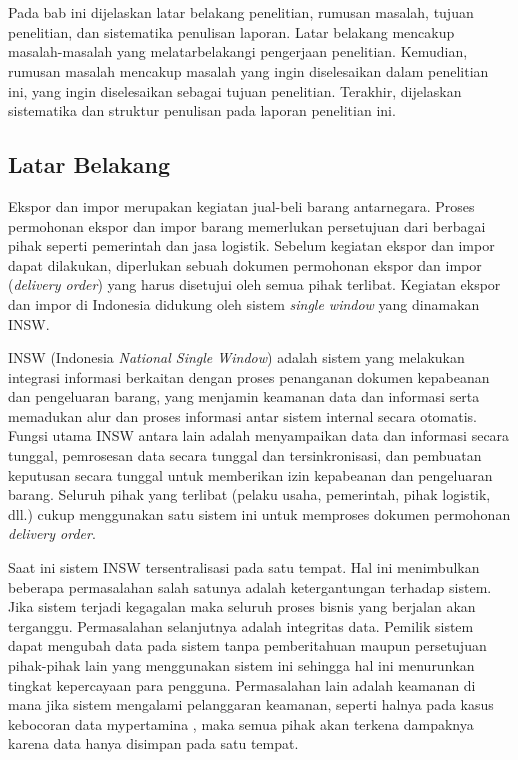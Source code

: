 \chapter{\babSatu}
\label{bab:1}

Pada bab ini dijelaskan latar belakang penelitian, rumusan masalah, tujuan penelitian, dan sistematika penulisan laporan. Latar belakang mencakup masalah-masalah yang melatarbelakangi pengerjaan penelitian. Kemudian, rumusan masalah mencakup masalah yang ingin diselesaikan dalam penelitian ini, yang ingin diselesaikan sebagai tujuan penelitian. Terakhir, dijelaskan sistematika dan struktur penulisan pada laporan penelitian ini.

\section{Latar Belakang}
\label{sec:latarBelakang}

Ekspor dan impor merupakan kegiatan jual-beli barang antarnegara. Proses permohonan ekspor dan impor barang memerlukan persetujuan dari berbagai pihak seperti pemerintah dan jasa logistik. Sebelum kegiatan ekspor dan impor dapat dilakukan, diperlukan sebuah dokumen permohonan ekspor dan impor (\textit{delivery order}) yang harus disetujui oleh semua pihak terlibat. Kegiatan ekspor dan impor di Indonesia didukung oleh sistem \textit{single window} yang dinamakan INSW.

INSW (Indonesia \textit{National Single Window}) adalah sistem yang melakukan integrasi informasi berkaitan dengan proses penanganan dokumen kepabeanan dan pengeluaran barang, yang menjamin keamanan data dan informasi serta memadukan alur dan proses informasi antar sistem internal secara otomatis. Fungsi utama INSW antara lain adalah menyampaikan data dan informasi secara tunggal, pemrosesan data secara tunggal dan tersinkronisasi, dan pembuatan keputusan secara tunggal untuk memberikan izin kepabeanan dan pengeluaran barang. Seluruh pihak yang terlibat (pelaku usaha, pemerintah, pihak logistik, dll.) cukup menggunakan satu sistem ini untuk memproses dokumen permohonan \textit{delivery order}.

Saat ini sistem INSW tersentralisasi pada satu tempat. Hal ini menimbulkan beberapa permasalahan salah satunya adalah ketergantungan terhadap sistem. Jika sistem terjadi kegagalan maka seluruh proses bisnis yang berjalan akan terganggu. Permasalahan selanjutnya adalah integritas data. Pemilik sistem dapat mengubah data pada sistem tanpa pemberitahuan maupun persetujuan pihak-pihak lain yang menggunakan sistem ini sehingga hal ini menurunkan tingkat kepercayaan para pengguna. Permasalahan lain adalah keamanan di mana jika sistem mengalami pelanggaran keamanan, seperti halnya pada kasus kebocoran data mypertamina \citep{Karina_2022}, maka semua pihak akan terkena dampaknya karena data hanya disimpan pada satu tempat. 

